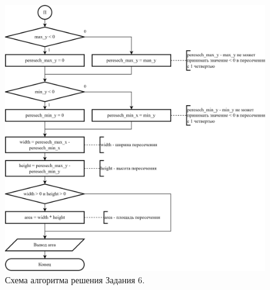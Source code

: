\documentclass[oneside,a4paper,14pt]{extarticle}
\begin{document}
\begin{figure}
	\centering
	\includegraphics[width=\textwidth]{img/6-scheme-p2.png} %
	\caption{Схема алгоритма решения Задания 6.} %
\end{figure}
\end{document}
